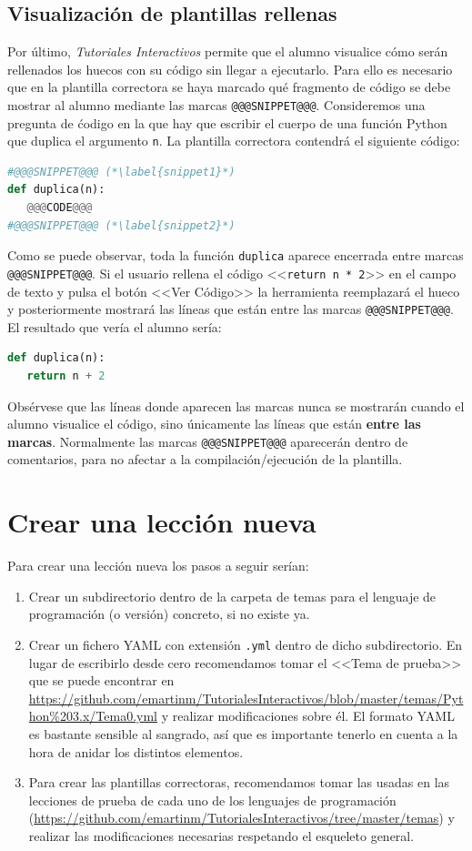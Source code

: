 \documentclass[]{article}
\newcommand{\code}[1]{{\lstinline[basicstyle=\ttfamily,mathescape]!#1!}}
\newcommand{\toolname}{\emph{Tutoriales Interactivos}}
\begin{document}
\subsection{Visualización de plantillas rellenas}
Por último, \toolname{} permite que el alumno visualice cómo serán rellenados los huecos con su código sin llegar a ejecutarlo. Para ello es necesario que en la plantilla correctora se haya marcado qué fragmento de código se debe mostrar al alumno mediante las marcas \code{@@@SNIPPET@@@}. Consideremos una pregunta de ćodigo en la que hay que escribir el cuerpo de una función Python que duplica el argumento \code{n}. La plantilla correctora contendrá el siguiente código:
\begin{lstlisting}[language=Python,basicstyle=\ttfamily, otherkeywords={with}]
#@@@SNIPPET@@@ (*\label{snippet1}*)
def duplica(n):
   @@@CODE@@@
#@@@SNIPPET@@@ (*\label{snippet2}*)
\end{lstlisting}
Como se puede observar, toda la función \code{duplica} aparece encerrada entre marcas \code{@@@SNIPPET@@@}. Si el usuario rellena el código <<\code{return n * 2}>> en el campo de texto y pulsa el botón <<Ver Código>> la herramienta reemplazará el hueco y posteriormente mostrará las líneas que están entre las marcas \code{@@@SNIPPET@@@}. El resultado que vería el alumno sería:
\begin{lstlisting}[language=Python,basicstyle=\ttfamily, otherkeywords={with}]
def duplica(n):
   return n + 2
\end{lstlisting}
Obsérvese que las líneas donde aparecen las marcas nunca se mostrarán cuando el alumno visualice el código, sino únicamente las líneas que están \textbf{entre las marcas}. Normalmente las marcas \code{@@@SNIPPET@@@} aparecerán dentro de comentarios, para no afectar a la compilación/ejecución de la plantilla.

\section{Crear una lección nueva}
Para crear una lección nueva los pasos a seguir serían:
\begin{enumerate}
	\item Crear un subdirectorio dentro de la carpeta de temas para el lenguaje de programación (o versión) concreto, si no existe ya.
	\item Crear un fichero YAML con extensión \code{.yml} dentro de dicho subdirectorio. En lugar de escribirlo desde cero recomendamos tomar el <<Tema de prueba>> que se puede encontrar en \url{https://github.com/emartinm/TutorialesInteractivos/blob/master/temas/Python%203.x/Tema0.yml} y realizar modificaciones sobre él. El formato YAML es bastante sensible al sangrado, así que es importante tenerlo en cuenta a la hora de anidar los distintos elementos.
	\item Para crear las plantillas correctoras, recomendamos tomar las usadas en las lecciones de prueba de cada uno de los lenguajes de programación (\url{https://github.com/emartinm/TutorialesInteractivos/tree/master/temas}) y realizar las modificaciones necesarias respetando el esqueleto general.
\end{enumerate}
\end{document}
